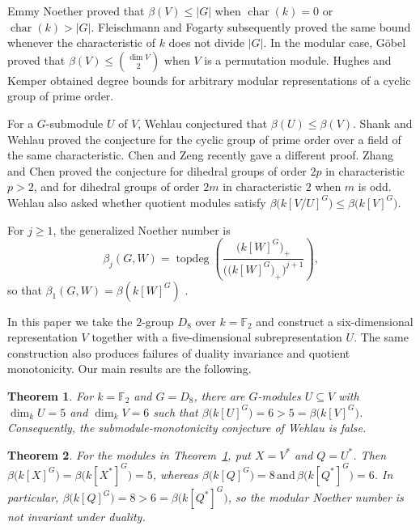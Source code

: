 \documentclass[11pt]{article}
\newtheorem{theorem}{Theorem}[section]
\theoremstyle{definition}
\newcommand{\F}{\mathbb F}
\begin{document}
	Emmy Noether \cite{Noe} proved that $\beta(V)\leq |G|$ when $\operatorname{char}(k)=0$ or $\operatorname{char}(k)>|G|$. Fleischmann \cite{Fl} and Fogarty \cite{F} subsequently proved the same bound whenever the characteristic of $k$ does not divide $|G|$. In the modular case, G\"obel \cite{G} proved that $\beta(V)\leq \binom{\dim V}{2}$ when $V$ is a permutation module. Hughes and Kemper \cite{HK} obtained degree bounds for arbitrary modular representations of a cyclic group of prime order.
	
	For a $G$-submodule $U$ of $V$, Wehlau \cite{OP} conjectured that $\beta(U)\leq\beta(V)$. Shank and Wehlau \cite{ShWe} proved the conjecture for the cyclic group of prime order over a field of the same characteristic. Chen and Zeng \cite{NP} recently gave a different proof. Zhang and Chen \cite{DG} proved the conjecture for dihedral groups of order $2p$ in characteristic $p>2$, and for dihedral groups of order $2m$ in characteristic $2$ when $m$ is odd. Wehlau \cite{OP} also asked whether quotient modules satisfy $\beta\bigl(k[V/U]^G\bigr)\leq\beta\bigl(k[V]^G\bigr)$.

	For $j\geq1$, the generalized Noether number is
	\[
	\beta_j(G,W)=
	\operatorname{topdeg}
	\left(
	\frac{\bigl(k[W]^G\bigr)_+}
	{\bigl(\bigl(k[W]^G\bigr)_+\bigr)^{j+1}}
	\right),
	\]
	so that $\beta_1(G,W)=\beta(k[W]^G)$ \cite{CD}.

	In this paper we take the $2$-group $D_8$ over $k=\mathbb F_2$ and construct a six-dimensional representation $V$ together with a five-dimensional subrepresentation $U$. The same construction also produces failures of duality invariance and quotient monotonicity. Our main results are the following.

	\begin{theorem}\label{thm:main}
		For $k=\F_2$ and $G=D_8$, there are $G$-modules $U\subseteq V$ with $\dim_kU=5$ and $\dim_kV=6$ such that $\beta\bigl(k[U]^G\bigr)=6>5=\beta\bigl(k[V]^G\bigr)$. Consequently, the submodule-monotonicity conjecture of Wehlau is false.
	\end{theorem}

	\begin{theorem}\label{thm:duality}
		For the modules in Theorem~\ref{thm:main}, put $X=V^*$ and $Q=U^*$. Then $\beta\bigl(k[X]^G\bigr)=\beta\bigl(k[X^*]^G\bigr)=5$, whereas $\beta\bigl(k[Q]^G\bigr)=8 \, \text{and}\, \beta\bigl(k[Q^*]^G\bigr)=6$. In particular, $\beta\bigl(k[Q]^G\bigr)=8>6=\beta\bigl(k[Q^*]^G\bigr)$, so the modular Noether number is not invariant under duality.
	\end{theorem}
\end{document}

